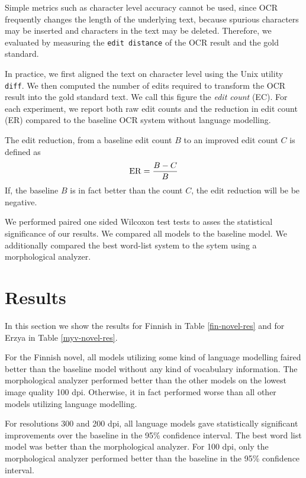\documentclass[b5paper]{article}
\begin{document}
Simple metrics such as character level accuracy cannot be used, since
OCR frequently changes the length of the underlying text, because
spurious characters may be inserted and characters in the text may be
deleted. Therefore, we evaluated by measuring the {\tt edit distance}
of the OCR result and the gold standard.

In practice, we first aligned the text on character level using the
Unix utility {\tt diff}. We then computed the number of edits required
to transform the OCR result into the gold standard text. We call this
figure the {\it edit count} (EC). For each experiment, we report both
raw edit counts and the reduction in edit count (ER) compared to the
baseline OCR system without language modelling.

The edit reduction, from a baseline edit count $B$ to an improved edit
count $C$ is defined as
$${\rm ER} = \frac{B - C}{B}$$
If, the baseline $B$ is in fact better than the count $C$, the edit
reduction will be be negative.

We performed paired one sided Wilcoxon test tests to asses the
statistical significance of our results. We compared all models to the
baseline model. We additionally compared the best word-list system to
the sytem using a morphological analyzer.

\section{Results}
\label{res}
In this section we show the results for Finnish in Table
\ref{fin-novel-res} and for Erzya in Table
\ref{myv-novel-res}. 

For the Finnish novel, all models utilizing some kind of language
modelling faired better than the baseline model without any kind of
vocabulary information. The morphological analyzer performed better
than the other models on the lowest image quality 100 dpi. Otherwise,
it in fact performed worse than all other models utilizing language
modelling.

For resolutions 300 and 200 dpi, all language models gave
statistically significant improvements over the baseline in the 95\%
confidence interval. The best word list model was better than the
morphological analyzer. For 100 dpi, only the morphological analyzer
performed better than the baseline in the 95\% confidence interval.
\end{document}
